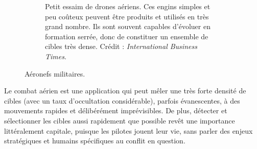 \begin{figure}[!htbp]
\begin{subfigure}[t]{\subImgAircraftW}
			\caption[Petit essaim de drones aériens]{Petit essaim de drones aériens. Ces engins simples et peu coûteux peuvent être produits et utilisés en très grand nombre. Ils sont souvent capables d'évoluer en formation serrée, donc de constituer un ensemble de cibles très dense. Crédit : \emph{International Business Times}.}
			\label{fig:swarm}
		\end{subfigure}
		\caption{Aéronefs militaires.}
		\label{fig:coolAircraft}
	\end{figure}
	
	Le combat aérien est une application qui peut mêler une très forte densité de cibles (avec un taux d'occultation considérable), parfois évanescentes, à des mouvements rapides et délibérément imprévisibles. De plus, détecter et sélectionner les cibles aussi rapidement que possible revêt une importance littéralement capitale, puisque les pilotes jouent leur vie, sans parler des enjeux stratégiques et humains spécifiques au conflit en question.
	




